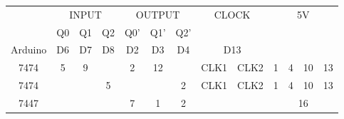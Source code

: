                             \label{table:4}
\begin{tabular}{|c|c|c|c|c|c|c|c|c|c|c|c|c|}      
\hline                              
\multirow{2}{*}{} & \multicolumn{3}{|c|}{INPUT} & \multicolumn{3}{|c|}{OUTPUT} & \multicolumn{2}{|c|}{\multirow{2}{*}{CLOCK}} & \multicolumn{4}{|c|}{\multirow{3}{*}{5V}} \\      
\cline{2-7}     
& Q0 & Q1 & Q2 & Q0' & Q1' & Q2' & \multicolumn{2}{|c|}{\multirow{2}{*}{}} & \multicolumn{4}{|c|}{} \\        
\hline          
Arduino & D6 & D7 & D8 & D2 & D3 & D4 & \multicolumn{2}{|c|}{D13} & \multicolumn{4}{|c|}{\multirow{3}{*}{}}\\                                   
\hline                             
7474 & 5 & 9 &  & 2 & 12 &  & CLK1 & CLK2 & 1 & 4 & 10 & 13 \\                   
\hline                     
7474 & & & 5 & & & 2 & CLK1 & CLK2 & 1 & 4  & 10 & 13 \\                       
\hline                         
7447 & \multicolumn{3}{|c|}{} & 7 & 1 & 2 & & & \multicolumn{4}{|c|}{16} \\              
\hline
\end{tabular}
